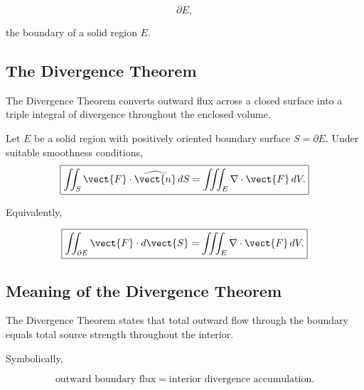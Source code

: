 \[ \partial E, \]

the boundary of a solid region \(E\).

\subsection{The Divergence Theorem}
\label{subsec:divergence-theorem}

The Divergence Theorem converts outward flux across a closed surface into a
triple integral of divergence throughout the enclosed volume.

\begin{theorem}
Let \(E\) be a solid region with positively oriented boundary surface
\(S=\partial E\). Under suitable smoothness conditions,
\[ \boxed{
\iint_S\vect{F}\cdot\widehat{\vect{n}}\,dS
=
\iiint_E\nabla\cdot\vect{F}\,dV.
} \]
\end{theorem}

Equivalently,

\[ \boxed{
\iint_{\partial E}\vect{F}\cdot d\vect{S}
=
\iiint_E\nabla\cdot\vect{F}\,dV.
} \]

\subsection{Meaning of the Divergence Theorem}
\label{subsec:meaning-divergence-theorem}

The Divergence Theorem states that total outward flow through the boundary
equals total source strength throughout the interior.

Symbolically,

\[ \boxed{\text{outward boundary flux}
=
\text{interior divergence accumulation}.} \]

\begin{center}
\end{center}


